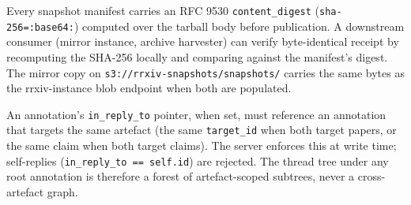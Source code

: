 \documentclass[11pt]{rrxiv}
\begin{document}
\begin{claim}[title=Snapshots are content-verifiable, type=empirical, evidence=experiment, labels={protocol-invariant}]
\label{claim:snapshots-content-verifiable}
Every snapshot manifest carries an RFC 9530 \texttt{content\_digest} (\texttt{sha-256=:base64:}) computed over the tarball body before publication. A downstream consumer (mirror instance, archive harvester) can verify byte-identical receipt by recomputing the SHA-256 locally and comparing against the manifest's digest. The mirror copy on \texttt{s3://rrxiv-snapshots/snapshots/} carries the same bytes as the rrxiv-instance blob endpoint when both are populated.
\end{claim}

\begin{claim}[title=Annotation threads are artefact-rooted, type=empirical, evidence=experiment, labels={protocol-invariant}]
\label{claim:annotation-threads-artefact-rooted}
An annotation's \texttt{in\_reply\_to} pointer, when set, must reference an annotation that targets the same artefact (the same \texttt{target\_id} when both target papers, or the same claim when both target claims). The server enforces this at write time; self-replies (\texttt{in\_reply\_to == self.id}) are rejected. The thread tree under any root annotation is therefore a forest of artefact-scoped subtrees, never a cross-artefact graph.
\end{claim}
\end{document}
